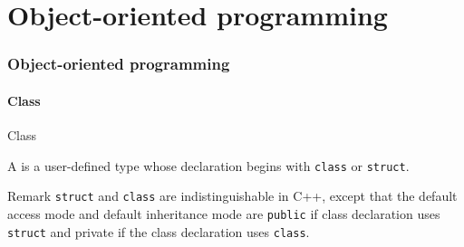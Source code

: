 \part{Object-oriented programming}
\label{part:oop}

\section{Object-oriented programming}

\subsection{Class}

\begin{frame}{Class}{}
  \begin{definition}[Class]
    A  is a user-defined type whose declaration begins with \lstinline!class! or \lstinline!struct!.
  \end{definition}

  \begin{block}{Remark}
    \lstinline!struct! and \lstinline!class! are indistinguishable in C++, except that the default access mode and default inheritance mode are \lstinline!public! if class declaration uses \lstinline!struct! and private if the class declaration uses \lstinline!class!.
  \end{block}
\end{frame}

